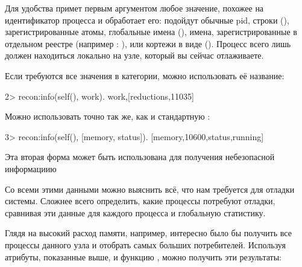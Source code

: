 \documentclass[11pt, oneside]{book}   	%
\begin{document}
Для удобства  примет первым аргументом любое значение, похожее на идентификатор процесса и обработает его: подойдут обычные pid, строки (), зарегистрированные атомы, глобальные имена (), имена, зарегистрированные в отдельном реестре (например : ), или кортежи в виде (). Процесс всего лишь должен находиться локально на узле, который вы сейчас отлаживаете.

Если требуются все значения в категории, можно использовать её название:

\begin{VerbatimEshell}
2> recon:info(self(), work).
{work,[{reductions,11035}]}
\end{VerbatimEshell}

Можно использовать точно так же, как и стандартную :

\begin{VerbatimEshell}
3> recon:info(self(), [memory, status]).
[{memory,10600},{status,running}]
\end{VerbatimEshell}

Эта вторая форма может быть использована для получения небезопасной информациию

Со всеми этими данными можно выяснить всё, что нам требуется для отладки системы. Сложнее всего определить, какие процессы потребуют отладки, сравнивая эти данные для каждого процесса и глобальную статистику.

Глядя на высокий расход памяти, например, интересно было бы получить все процессы данного узла и отобрать  самых больших потребителей. Используя атрибуты, показанные выше, и функцию , можно получить эти результаты:
\end{document}
